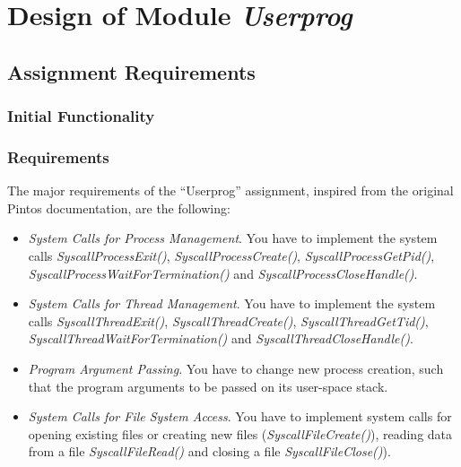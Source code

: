 
\chapter{Design of Module \textit{Userprog}}

\section{Assignment Requirements}


\subsection{Initial Functionality}


\subsection{Requirements}

The major requirements of the ``Userprog'' assignment, inspired from the original Pintos documentation, are the following:
\begin{itemize}
    \item \textit{System Calls for Process Management}. You have to implement the system calls \textit{SyscallProcessExit()}, \textit{SyscallProcessCreate()}, \textit{SyscallProcessGetPid()}, \textit{SyscallProcessWaitForTermination()} and \textit{SyscallProcessCloseHandle()}.

    \item \textit{System Calls for Thread Management}. You have to implement the system calls \textit{SyscallThreadExit()}, \textit{SyscallThreadCreate()}, \textit{SyscallThreadGetTid()}, \textit{SyscallThreadWaitForTermination()} and \textit{SyscallThreadCloseHandle()}.

    \item \textit{Program Argument Passing}. You have to change new process creation, such that the program arguments to be passed on its user-space stack.
    
    \item \textit{System Calls for File System Access}. You have to implement system calls for opening existing files or creating new files (\textit{SyscallFileCreate()}), reading data from a file \textit{SyscallFileRead()} and closing a file \textit{SyscallFileClose()}).
\end{itemize}

